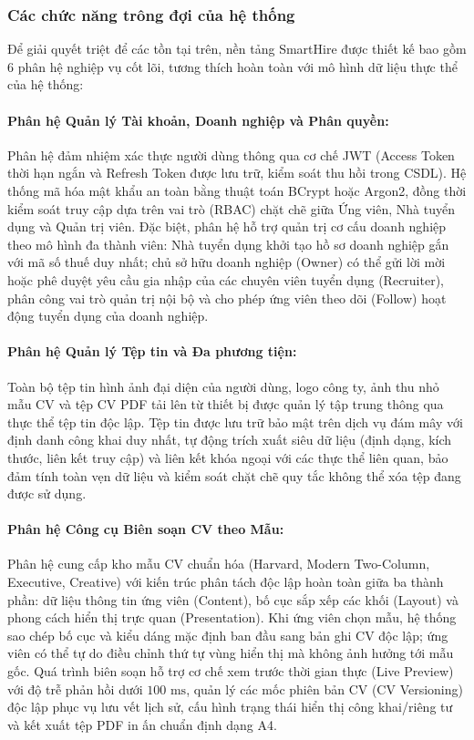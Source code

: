 \subsubsection{Các chức năng trông đợi của hệ thống}
Để giải quyết triệt để các tồn tại trên, nền tảng SmartHire được thiết kế bao gồm 6 phân hệ nghiệp vụ cốt lõi, tương thích hoàn toàn với mô hình dữ liệu thực thể của hệ thống:

\paragraph{Phân hệ Quản lý Tài khoản, Doanh nghiệp và Phân quyền:}
Phân hệ đảm nhiệm xác thực người dùng thông qua cơ chế JWT (Access Token thời hạn ngắn và Refresh Token được lưu trữ, kiểm soát thu hồi trong CSDL). Hệ thống mã hóa mật khẩu an toàn bằng thuật toán BCrypt hoặc Argon2, đồng thời kiểm soát truy cập dựa trên vai trò (RBAC) chặt chẽ giữa Ứng viên, Nhà tuyển dụng và Quản trị viên. 
Đặc biệt, phân hệ hỗ trợ quản trị cơ cấu doanh nghiệp theo mô hình đa thành viên: Nhà tuyển dụng khởi tạo hồ sơ doanh nghiệp gắn với mã số thuế duy nhất; chủ sở hữu doanh nghiệp (Owner) có thể gửi lời mời hoặc phê duyệt yêu cầu gia nhập của các chuyên viên tuyển dụng (Recruiter), phân công vai trò quản trị nội bộ và cho phép ứng viên theo dõi (Follow) hoạt động tuyển dụng của doanh nghiệp.

\paragraph{Phân hệ Quản lý Tệp tin và Đa phương tiện:}
Toàn bộ tệp tin hình ảnh đại diện của người dùng, logo công ty, ảnh thu nhỏ mẫu CV và tệp CV PDF tải lên từ thiết bị được quản lý tập trung thông qua thực thể tệp tin độc lập. Tệp tin được lưu trữ bảo mật trên dịch vụ đám mây với định danh công khai duy nhất, tự động trích xuất siêu dữ liệu (định dạng, kích thước, liên kết truy cập) và liên kết khóa ngoại với các thực thể liên quan, bảo đảm tính toàn vẹn dữ liệu và kiểm soát chặt chẽ quy tắc không thể xóa tệp đang được sử dụng.

\paragraph{Phân hệ Công cụ Biên soạn CV theo Mẫu:}
Phân hệ cung cấp kho mẫu CV chuẩn hóa (Harvard, Modern Two-Column, Executive, Creative) với kiến trúc phân tách độc lập hoàn toàn giữa ba thành phần: dữ liệu thông tin ứng viên (Content), bố cục sắp xếp các khối (Layout) và phong cách hiển thị trực quan (Presentation). Khi ứng viên chọn mẫu, hệ thống sao chép bố cục và kiểu dáng mặc định ban đầu sang bản ghi CV độc lập; ứng viên có thể tự do điều chỉnh thứ tự vùng hiển thị mà không ảnh hưởng tới mẫu gốc. Quá trình biên soạn hỗ trợ cơ chế xem trước thời gian thực (Live Preview) với độ trễ phản hồi dưới $100\text{ ms}$, quản lý các mốc phiên bản CV (CV Versioning) độc lập phục vụ lưu vết lịch sử, cấu hình trạng thái hiển thị công khai/riêng tư và kết xuất tệp PDF in ấn chuẩn định dạng A4.

